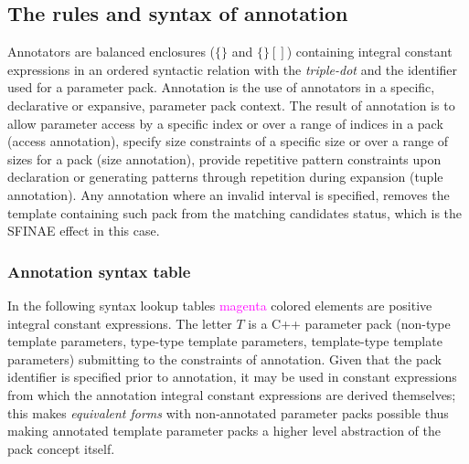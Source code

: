 
\subsection{The rules and syntax of annotation}

\p Annotators are balanced enclosures ($\bm{\{\}}$ and $\bm{\{\}[]}$) containing integral constant expressions in an ordered syntactic relation with the \textit{triple-dot} and the identifier used for a parameter pack.
Annotation is the use of annotators in a specific, declarative or expansive, parameter pack context.
The result of annotation is to allow parameter access by a specific index or over a range of indices in a pack (access annotation), specify size constraints of a specific size or over a range of sizes for a pack (size annotation), provide repetitive pattern constraints upon declaration or generating patterns through repetition during expansion (tuple annotation).
Any annotation where an invalid interval is specified, removes the template containing such pack from the matching candidates status, which is the SFINAE \cite{sfinae} effect in this case.

\subsubsection{Annotation syntax table}

\p In the following syntax lookup tables \textcolor{Magenta}{magenta} colored elements are positive integral constant expressions.
The letter $T$ is a C++ parameter pack (non-type template parameters, type-type template parameters, template-type template parameters) submitting to the constraints of annotation.
Given that the pack identifier is specified prior to annotation, it may be used in constant expressions from which the annotation integral constant expressions are derived themselves; this makes \textit{equivalent forms} with non-annotated parameter packs possible thus making annotated template parameter packs a higher level abstraction of the pack concept itself.


